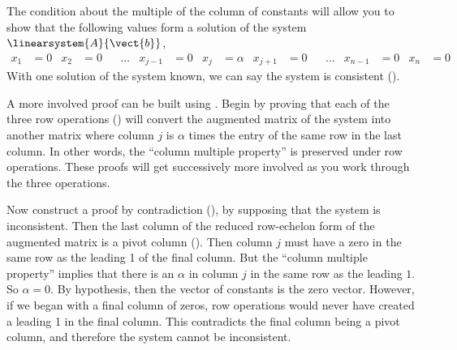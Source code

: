 The condition about the multiple of the column of constants will allow you to show that the following values form a solution of the system $\linearsystem{A}{\vect{b}}$,
\begin{align*}
x_1&=0
&
x_2&=0
&
&\ldots
&
x_{j-1}&=0
&
x_j&=\alpha
&
x_{j+1}&=0
&
&\ldots
&
x_{n-1}&=0
&
x_n&=0
&
\end{align*}
%
With one solution of the system known, we can say the system is consistent ().\par
%
A more involved proof can be built using .  Begin by proving that each of the three row operations () will convert the augmented matrix of the system into another matrix where column $j$ is $\alpha$ times the entry of the same row in the last column.  In other words, the ``column multiple property'' is preserved under row operations.  These proofs will get successively more involved as you work through the three operations.\par
%
Now construct a proof by contradiction (), by supposing that the system is inconsistent.  Then the last column of the reduced row-echelon form of the augmented matrix is a pivot column ().  Then column $j$ must have a zero in the same row as the leading 1 of the final column.  But the ``column multiple property'' implies that there is an $\alpha$ in column $j$ in the same row as the leading $1$.  So $\alpha = 0$.  By hypothesis, then the vector of constants is the zero vector.  However, if we began with a final column of zeros, row operations would never have created a leading 1 in the final column.  This contradicts the final column being a pivot column, and therefore the system cannot be inconsistent. 
